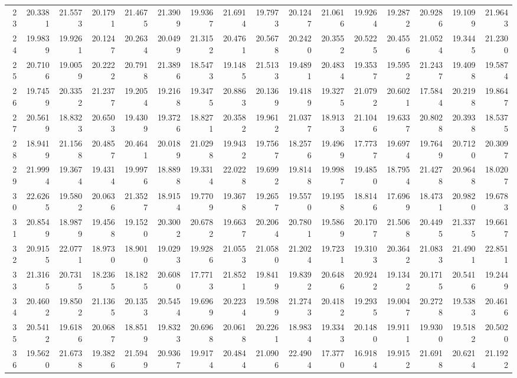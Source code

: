 \documentclass[12pt]{article}\usepackage[]{graphicx}\usepackage[]{color}
\begin{document}
\begin{landscape}
\begin{longtable}[t]{rrrrrrrrrrrrrrrr}
23 & 20.3381 & 21.5573 & 20.1791 & 21.4675 & 21.3909 & 19.9367 & 21.6914 & 19.7973 & 20.1247 & 21.0616 & 19.9264 & 19.2872 & 20.9286 & 19.1099 & 21.9643\\
24 & 19.9839 & 19.9261 & 20.1247 & 20.2634 & 20.0499 & 21.3152 & 20.4761 & 20.5678 & 20.2420 & 20.3552 & 20.5225 & 20.4556 & 21.0524 & 19.3445 & 21.2300\\
25 & 20.7106 & 19.0059 & 20.2222 & 20.7918 & 21.3896 & 18.5473 & 19.1485 & 21.5133 & 19.4891 & 20.4834 & 19.3537 & 19.5952 & 21.2437 & 19.4098 & 19.5874\\
26 & 19.7459 & 20.3352 & 21.2377 & 19.2054 & 19.2168 & 19.3475 & 20.8863 & 20.1369 & 19.4189 & 19.3275 & 21.0792 & 20.6021 & 17.5844 & 20.2198 & 19.8647\\
27 & 20.5619 & 18.8323 & 20.6503 & 19.4309 & 19.3726 & 18.8271 & 20.3582 & 19.9612 & 21.0377 & 18.9133 & 21.1046 & 19.6337 & 20.8028 & 20.3938 & 18.5375\\
28 & 18.9419 & 21.1568 & 20.4857 & 20.4641 & 20.0189 & 21.0298 & 19.9432 & 19.7567 & 18.2576 & 19.4969 & 17.7737 & 19.6974 & 19.7649 & 20.7120 & 20.3097\\
29 & 21.9994 & 19.3674 & 19.4314 & 19.9976 & 18.8898 & 19.3314 & 22.0228 & 19.6992 & 19.8148 & 19.9987 & 19.4850 & 18.7954 & 21.4278 & 20.9648 & 18.0207\\
30 & 22.6265 & 19.5802 & 20.0636 & 21.3527 & 18.9154 & 19.7709 & 19.3678 & 19.2657 & 19.5570 & 19.1958 & 18.8146 & 17.6969 & 18.4731 & 20.9820 & 19.6783\\
31 & 20.8549 & 18.9879 & 19.4568 & 19.1520 & 20.3002 & 20.6782 & 19.6637 & 20.2064 & 20.7801 & 19.5869 & 20.1707 & 21.5068 & 20.4495 & 21.3375 & 19.6617\\
32 & 20.9155 & 22.0771 & 18.9730 & 18.9010 & 19.0293 & 19.9286 & 21.0553 & 21.0580 & 21.2024 & 19.7231 & 19.3103 & 20.3642 & 21.0833 & 21.4901 & 22.8511\\
33 & 21.3165 & 20.7315 & 18.2365 & 18.1825 & 20.6080 & 17.7713 & 21.8521 & 19.8419 & 19.8392 & 20.6486 & 20.9242 & 19.1342 & 20.1715 & 20.5416 & 19.2449\\
34 & 20.4602 & 19.8502 & 21.1365 & 20.1353 & 20.5454 & 19.6969 & 20.2234 & 19.5989 & 21.2743 & 20.4182 & 19.2935 & 19.0047 & 20.2728 & 19.5383 & 20.4616\\
35 & 20.5412 & 19.6186 & 20.0687 & 18.8519 & 19.8323 & 20.6968 & 20.0618 & 20.2261 & 18.9834 & 19.3343 & 20.1480 & 19.9111 & 19.9300 & 19.5182 & 20.5020\\
36 & 19.5620 & 21.6738 & 19.3826 & 21.5949 & 20.9367 & 19.9174 & 20.4844 & 21.0906 & 22.4904 & 17.3770 & 16.9184 & 19.9152 & 21.6918 & 20.6214 & 21.1922\\

\end{longtable}
\end{landscape}
\end{document}
